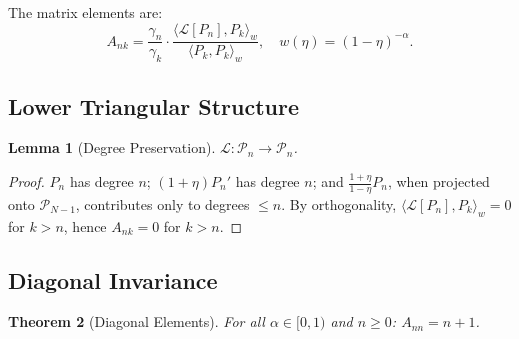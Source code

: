 \documentclass{article}
\theoremstyle{plain}
\newtheorem{theorem}{Theorem}[section]
\newtheorem{lemma}[theorem]{Lemma}
\theoremstyle{definition}
\theoremstyle{remark}
\begin{document}
The matrix elements are:
\begin{equation}
	A_{nk} = \frac{\gamma_n}{\gamma_k} \cdot \frac{\langle \mathcal{L}[P_n], P_k \rangle_w}{\langle P_k, P_k \rangle_w}, \quad w(\eta) = (1-\eta)^{-\alpha}.
\end{equation}

\subsection{Lower Triangular Structure}

\begin{lemma}[Degree Preservation]
	$\mathcal{L}: \mathcal{P}_n \to \mathcal{P}_n$.
\end{lemma}

\begin{proof}
	$P_n$ has degree $n$; $(1+\eta)P_n'$ has degree $n$; and $\frac{1+\eta}{1-\eta}P_n$, when projected onto $\mathcal{P}_{N-1}$, contributes only to degrees $\leq n$. By orthogonality, $\langle \mathcal{L}[P_n], P_k \rangle_w = 0$ for $k > n$, hence $A_{nk} = 0$ for $k > n$.
\end{proof}

\subsection{Diagonal Invariance}

\begin{theorem}[Diagonal Elements]
	\label{thm:diagonal_proof}
	For all $\alpha \in [0, 1)$ and $n \geq 0$: $A_{nn} = n + 1$.
\end{theorem}
\end{document}
